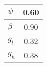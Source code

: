 \begin{tiny}\begin{tabular}{|l|c|}
\hline
\textbf{$\psi$}&0.60\\\hline
\textbf{$\beta$}&0.90\\\hline
\textbf{$g_{l}$}&0.32\\\hline
\textbf{$g_{h}$}&0.38\\\hline
\end{tabular}
\end{tiny}